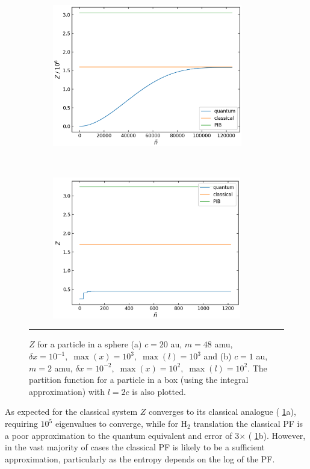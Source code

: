 \documentclass[../main.tex]{subfiles}
\begin{document}
\begin{figure}[b!]
	\begin{subfigure}[t]{0.49\textwidth}
		\centering
		\includegraphics[height=6.2cm]{4/figs/spherical_well_20_c_87456_m_point1_dx_pf}
		\caption{}
	\end{subfigure}%
	~ 
	\begin{subfigure}[t]{0.49\textwidth}
		\centering
		\includegraphics[height=6.2cm]{4/figs/spherical_well_1_c_3644_m_pf}
		\caption{}
	\end{subfigure}
	\vspace{0.2cm}
	\hrule
	\caption{$Z$ for a particle in a sphere (a) $c = 20$ au, $m = 48$ amu, $\delta x = 10^{-1},\;\max(x) = 10^3,\;\max(l) = 10^3$ and (b) $c = 1$ au, $m = 2$ amu, $\delta x = 10^{-2} ,\;\max(x) = 10^2,\;\max(l) = 10^2$. The partition function for a particle in a box (using the integral approximation) with $l = 2c$ is also plotted.} 
	\label{spherical_well_quantum_classical}
\end{figure}


As expected for the classical system $Z$ converges to its classical analogue (\figurename{ \ref{spherical_well_quantum_classical}}a), requiring $10^5$ eigenvalues to converge, while for H$_2$ translation the classical PF is a poor approximation to the quantum equivalent and error of 3$\times$ (\figurename{ \ref{spherical_well_quantum_classical}}b). However, in the vast majority of cases the classical PF is likely to be a sufficient approximation, particularly as the entropy depends on the log of the PF.
\end{document}
